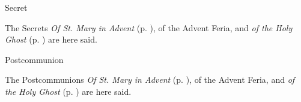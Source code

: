 \begin{inhead}
    Secret
\end{inhead}
\begin{rubric}
    The Secrets \emph{Of St. Mary in Advent} (p. \pageref{SPMaryInAdvent}), of the Advent Feria, and \emph{of the Holy Ghost} (p. \pageref{SPHolyGhost}) are here said.
\end{rubric}

\begin{inhead}
    Postcommunion
\end{inhead}
\begin{rubric}
    The Postcommunions \emph{Of St. Mary in Advent} (p. \pageref{SPMaryInAdvent}), of the Advent Feria, and \emph{of the Holy Ghost} (p. \pageref{SPHolyGhost}) are here said.
\end{rubric}

